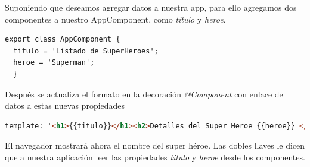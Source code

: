 \documentclass[12pt,twoside]{book}
\begin{document}
Suponiendo que deseamos agregar datos a nuestra app, para ello agregamos dos componentes a nuestro AppComponent, como \textit{título} y \textit{heroe}.


\begin{lstlisting}[language=html]
export class AppComponent {
  titulo = 'Listado de SuperHeroes';
  heroe = 'Superman';
  }
  \end{lstlisting}


Después se actualiza el formato en la decoración \textit{@Component} con enlace de datos a estas nuevas propiedades


\begin{lstlisting}[language=html]
template: '<h1>{{titulo}}</h1><h2>Detalles del Super Heroe {{heroe}} </h2>'
  \end{lstlisting}
  
  El navegador mostrará ahora el nombre del super héroe. Las dobles llaves le dicen que a nuestra aplicación leer las propiedades \textit{titulo} y \textit{heroe} desde los componentes.
\end{document}
